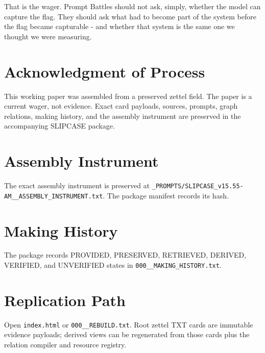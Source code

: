 \documentclass[11pt]{article}
\begin{document}
That is the wager. Prompt Battles should not ask, simply, whether the model can capture the flag. They should ask what had to become part of the system before the flag became capturable - and whether that system is the same one we thought we were measuring.

\section*{Acknowledgment of Process}
This working paper was assembled from a preserved zettel field. The paper is a current wager, not evidence. Exact card payloads, sources, prompts, graph relations, making history, and the assembly instrument are preserved in the accompanying SLIPCASE package.

\appendix
\section{Assembly Instrument}
The exact assembly instrument is preserved at \texttt{\_PROMPTS/SLIPCASE\_v15.55-AM\_\_ASSEMBLY\_INSTRUMENT.txt}. The package manifest records its hash.

\section{Making History}
The package records PROVIDED, PRESERVED, RETRIEVED, DERIVED, VERIFIED, and UNVERIFIED states in \texttt{000\_\_MAKING\_HISTORY.txt}.

\section{Replication Path}
Open \texttt{index.html} or \texttt{000\_\_REBUILD.txt}. Root zettel TXT cards are immutable evidence payloads; derived views can be regenerated from those cards plus the relation compiler and resource registry.
\end{document}
